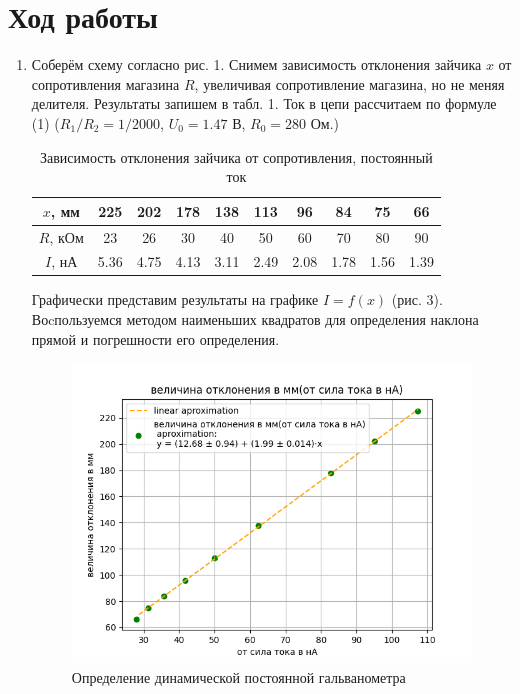 \documentclass[a4paper]{article}
\begin{document}
\section{Ход работы}
\begin{enumerate}
    \item Соберём схему согласно рис. 1. Снимем зависимость отклонения зайчика $x$ от сопротивления магазина $R$, увеличивая сопротивление магазина, но не меняя делителя. Результаты запишем в табл. 1. Ток в цепи рассчитаем по формуле (1) ($R_1/R_2 = 1/2000$, $U_0 = 1.47$ В, $R_0 = 280$ Ом.)

          \begin{table}[H]
              \centering
              \begin{center}
                  \caption{Зависимость отклонения зайчика от сопротивления, постоянный ток}
              \end{center}
              \vspace{0.1cm}
              \label{tab:my_label}
              \begin{tabular}{|c|c|c|c|c|c|c|c|c|c|}
                  \hline
                  $x$, мм  & 225  & 202  & 178  & 138  & 113  & 96   & 84   & 75   & 66   \\
                  \hline
                  $R$, кОм & 23   & 26   & 30   & 40   & 50   & 60   & 70   & 80   & 90   \\
                  \hline
                  $I$, нА  & 5.36 & 4.75 & 4.13 & 3.11 & 2.49 & 2.08 & 1.78 & 1.56 & 1.39 \\
                  \hline
              \end{tabular}
          \end{table}

          Графически представим результаты на графике $I = f(x)$ (рис. 3). Воcпользуемся методом наименьших квадратов для определения наклона прямой и погрешности его определения.

          \begin{figure}[h]
              \centering
              \includegraphics[width=\textwidth]{Figure_1.png}
              \caption{Определение динамической постоянной гальванометра}
              \label{fig:vac}
          \end{figure}


\end{enumerate}
\end{document}
